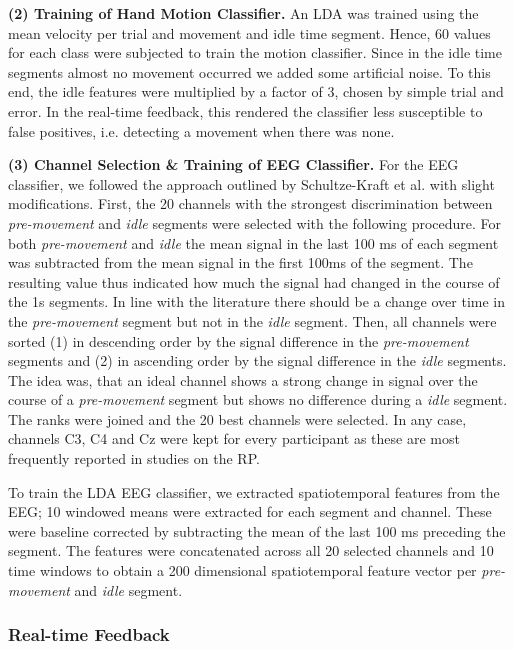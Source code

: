 \indent\textbf{(2) Training of Hand Motion Classifier.}
An LDA was trained using the mean velocity per trial and movement and idle time segment. Hence, 60 values for each class were subjected to train the motion classifier. Since in the idle time segments almost no movement occurred we added some artificial noise. To this end, the idle features were multiplied by a factor of 3, chosen by simple trial and error. In the real-time feedback, this rendered the classifier less susceptible to false positives, i.e. detecting a movement when there was none.

\indent\textbf{(3) Channel Selection \& Training of EEG Classifier.}
For the EEG classifier, we followed the approach outlined by Schultze-Kraft et al.\cite{} with slight modifications. First, the 20 channels with the strongest discrimination between \textit{pre-movement} and \textit{idle} segments were selected with the following procedure. For both \textit{pre-movement} and \textit{idle} the mean signal in the last 100 ms of each segment was subtracted from the mean signal in the first 100ms of the segment. The resulting value thus indicated how much the signal had changed in the course of the 1s segments. In line with the literature there should be a change over time in the \textit{pre-movement} segment but not in the \textit{idle} segment. Then, all channels were sorted (1) in descending order by the signal difference in the \textit{pre-movement} segments and (2) in ascending order by the signal difference in the \textit{idle} segments. The idea was, that an ideal channel shows a strong change in signal over the course of a \textit{pre-movement} segment but shows no difference during a \textit{idle} segment. The ranks were joined and the 20 best channels were selected. In any case, channels C3, C4 and Cz were kept for every participant as these are most frequently reported in studies on the RP.

To train the LDA EEG classifier, we extracted spatiotemporal features from the EEG; 10 windowed means were extracted for each segment and channel. These were baseline corrected by subtracting the mean of the last 100 ms preceding the segment. The features were concatenated across all 20 selected channels and 10 time windows to obtain a 200 dimensional spatiotemporal feature vector per \textit{pre-movement} and \textit{idle} segment.

\subsubsection{Real-time Feedback}

